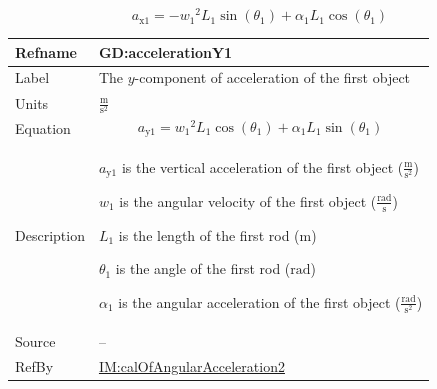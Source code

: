 \documentclass[12pt]{article}
\begin{document}
\begin{displaymath}
{a_{\text{x}1}}=-{w_{1}}^{2} {L_{1}} \sin\left({θ_{1}}\right)+{α_{1}} {L_{1}} \cos\left({θ_{1}}\right)
\end{displaymath}
\vspace{\baselineskip}
\noindent
\begin{minipage}{\textwidth}
\begin{tabular}{>{\raggedright}p{}>{\raggedright\arraybackslash}p{}}
\toprule \textbf{Refname} & \textbf{GD:accelerationY1}
\label{GD:accelerationY1}
\\ \midrule
Label & The $y$-component of acceleration of the first object
        
\\ \midrule
Units & $\frac{\text{m}}{\text{s}^{2}}$
        
\\ \midrule
Equation & \begin{displaymath}
           {a_{\text{y}1}}={w_{1}}^{2} {L_{1}} \cos\left({θ_{1}}\right)+{α_{1}} {L_{1}} \sin\left({θ_{1}}\right)
           \end{displaymath}
\\ \midrule
Description & \begin{symbDescription}
              \item{${a_{\text{y}1}}$ is the vertical acceleration of the first object ($\frac{\text{m}}{\text{s}^{2}}$)}
              \item{${w_{1}}$ is the angular velocity of the first object ($\frac{\text{rad}}{\text{s}}$)}
              \item{${L_{1}}$ is the length of the first rod (${\text{m}}$)}
              \item{${θ_{1}}$ is the angle of the first rod (${\text{rad}}$)}
              \item{${α_{1}}$ is the angular acceleration of the first object ($\frac{\text{rad}}{\text{s}^{2}}$)}
              \end{symbDescription}
\\ \midrule
Source & --
         
\\ \midrule
RefBy & \hyperref[IM:calOfAngularAcceleration2]{IM:calOfAngularAcceleration2}
        
\\ \bottomrule
\end{tabular}
\end{minipage}
\end{document}
